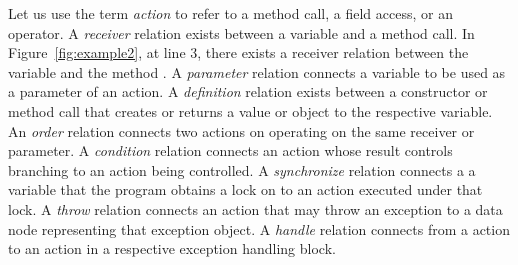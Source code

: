 Let us use the term {\em action} to refer to a method call, a field
access, or an operator. A {\em receiver} relation exists between a
variable and a method call. In Figure~\ref{fig:example2},
at line 3, there exists a receiver relation between the variable
 and the method . A {\em
  parameter} relation connects a variable to be used as a parameter of
an action. A {\em definition} relation exists between a constructor or
method call that creates or returns a value or object to the
respective variable. An {\em order} relation connects two actions on
operating on the same receiver or parameter. A {\em condition}
relation connects an action whose result controls branching to an
action being controlled. A {\em synchronize} relation connects a a
variable that the program obtains a lock on to an action executed
under that lock. A {\em throw} relation connects an action that may
throw an exception to a data node representing that exception
object. A {\em handle} relation connects from a  action to
an action in a respective exception handling block.

